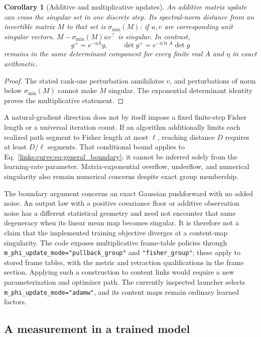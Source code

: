 \documentclass[11pt]{article}
\newtheorem{corollary}[theorem]{Corollary}
\theoremstyle{definition}
\theoremstyle{remark}
\providecommand{\cfg}[1]{{\small\texttt{#1}}}
\begin{document}
\begin{corollary}[Additive and multiplicative updates]
\label{links:curve:cor:updates}
An additive matrix update can cross the singular set in one discrete step. Its spectral-norm distance from an invertible matrix $M$ to that set is $\sigma_{\min}(M)$: if $u,v$ are corresponding unit singular vectors, $M-\sigma_{\min}(M)uv^\top$ is singular. In contrast,
\begin{equation}
g^+=e^{-\eta A}g,
\qquad \det g^+=e^{-\eta\operatorname{tr}A}\det g
\label{links:curve:eq:group_update}
\end{equation}
remains in the same determinant component for every finite real $A$ and $\eta$ in exact arithmetic.
\end{corollary}
\begin{proof}
The stated rank-one perturbation annihilates $v$, and perturbations of norm below $\sigma_{\min}(M)$ cannot make $M$ singular. The exponential determinant identity proves the multiplicative statement.
\end{proof}
A natural-gradient direction does not by itself impose a fixed finite-step Fisher length or a universal iteration count. If an algorithm additionally limits each realized path segment to Fisher length at most $\ell$, reaching distance $D$ requires at least $D/\ell$ segments. That conditional bound applies to Eq.~\eqref{links:curve:eq:general_boundary}; it cannot be inferred solely from the learning-rate parameter. Matrix-exponential overflow, underflow, and numerical singularity also remain numerical concerns despite exact group membership.

The boundary argument concerns an exact Gaussian pushforward with no added noise. An output law with a positive covariance floor or additive observation noise has a different statistical geometry and need not encounter that same degeneracy when its linear mean map becomes singular. It is therefore not a claim that the implemented training objective diverges at a content-map singularity. The code exposes multiplicative frame-table policies through \cfg{m\_phi\_update\_mode="pullback\_group"} and \cfg{"fisher\_group"}; these apply to stored frame tables, with the metric and retraction qualifications in the frame section. Applying such a construction to content links would require a new parameterization and optimizer path. The currently inspected launcher selects \cfg{m\_phi\_update\_mode="adamw"}, and its content maps remain ordinary learned factors.

\subsection{A measurement in a trained model}
\label{links:origin:sec:measurement}
\end{document}
